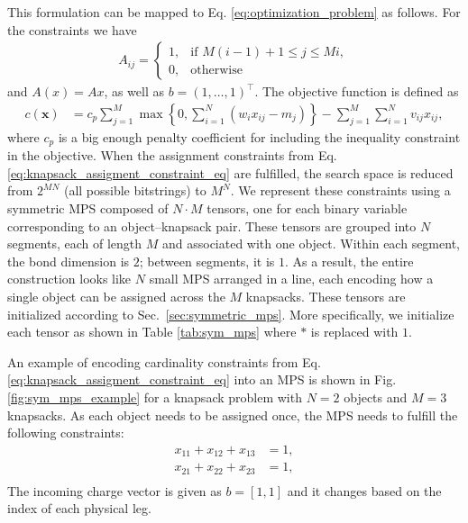 This formulation can be mapped to Eq. \eqref{eq:optimization_problem} as follows. For the constraints we have
\begin{align*}
A_{ij} = \begin{cases}
    1,& \text{if } M(i-1)+1 \leq j \leq Mi, \\
    0,& \text{otherwise}
\end{cases}
\end{align*}
and $A(x)=Ax$, as well as $b= (1,\ldots,1)^\top$.
The objective function is defined as 
\begin{align*}
    c(\mathbf{x}) & = c_p \sum_{j=1}^{M}\max\left\{0, \sum_{i=1}^{N}(w_{i} x_{ij}-m_j)\right\} -\sum_{j=1}^{M}\sum_{i=1}^{N} v_{ij} x_{ij},
\end{align*}
where $c_p$ is a big enough penalty coefficient for including the inequality constraint in the objective.
When the assignment constraints from Eq. \eqref{eq:knapsack_assigment_constraint_eq} are fulfilled, the search space is reduced from $2^{MN}$ (all possible bitstrings) to $M^N$.
We represent these constraints using a symmetric MPS composed of 
$N\cdot M$ tensors, one for each binary variable corresponding to an object–knapsack pair. These tensors are grouped into 
$N$ segments, each of length 
$M$ and associated with one object. Within each segment, the bond dimension is 
$2$; between segments, it is $1$. As a result, the entire construction looks like 
$N$ small MPS arranged in a line, each encoding how a single object can be assigned across the 
$M$ knapsacks. These tensors are initialized according to Sec.~\ref{sec:symmetric_mps}. More specifically, we initialize each tensor as shown in Table \ref{tab:sym_mps} where $*$ is replaced with $1$.

An example of encoding cardinality constraints from Eq. \eqref{eq:knapsack_assigment_constraint_eq} into an MPS is shown in Fig. \ref{fig:sym_mps_example} for a knapsack problem with $N=2$ objects and $M=3$ knapsacks. As each object needs to be assigned once, the MPS needs to fulfill the following constraints:
\begin{align*}
        x_{11}+x_{12}+x_{13} &= 1, \\
        x_{21}+x_{22}+x_{23} &= 1, \\
\end{align*}
The incoming charge vector is given as ${b}=[1,1]$ and it changes based on the index of each physical leg.


